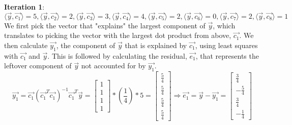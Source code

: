 \documentclass[11pt,letterpaper]{article}
\begin{document}
\textbf{Iteration 1}: \\
\begin{equation*}
    \langle\vec{y},\vec{c_{1}}\rangle = 5,        
    \langle\vec{y},\vec{c_{2}}\rangle = 2,
    \langle\vec{y},\vec{c_{3}}\rangle = 3,
    \langle\vec{y},\vec{c_{4}}\rangle = 4,
    \langle\vec{y},\vec{c_{5}}\rangle = 2,
    \langle\vec{y},\vec{c_{6}}\rangle = 0,
    \langle\vec{y},\vec{c_{7}}\rangle = 2,
    \langle\vec{y},\vec{c_{8}}\rangle = 1
\end{equation*}
We first pick the vector that "explains" the largest component of $\vec{y}$, which translates to picking the vector with the largest dot product from above, $\vec{c_{1}}$. We then calculate $\vec{y_{1}}$, the component of $\vec{y}$ that is explained by $\vec{c_{1}}$, using least squares with $\vec{c_{1}}$ and $\vec{y}$. This is followed by calculating the residual, $\vec{e_{1}}$, that represents the leftover component of $\vec{y}$ not accounted for by $\vec{y_{1}}$.
\begin{equation*}
    \vec{y_{1}} = \vec{c_{1}}(\vec{c_{1}}^T\vec{c_{1}})^{-1}\vec{c_{1}}^T\vec{y} = \begin{bmatrix}
         1 \\ 1 \\ 1 \\ 1
    \end{bmatrix} *(\frac{1}{4}) * 5
    = \begin{bmatrix}
         \frac{5}{4} \\ \frac{5}{4} \\ \frac{5}{4} \\ \frac{5}{4}
    \end{bmatrix} \Rightarrow
    \vec{e_{1}} = \vec{y} - \vec{y_{1}} =
    \begin{bmatrix}
        \frac{3}{4} \\ -\frac{5}{4} \\ \frac{3}{4} \\ -\frac{1}{4}
    \end{bmatrix}
\end{equation*}
\end{document}
